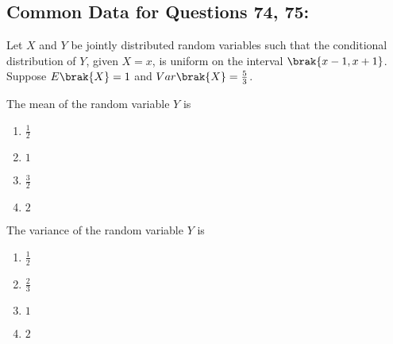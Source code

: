 \subsection*{Common Data for Questions 74, 75:}
Let $X$ and $Y$ be jointly distributed random variables such that the conditional distribution of $Y$, given $X = x$, is uniform on the interval $\brak{x-1, x+1}$. Suppose $E\brak{X} = 1$ and $Var\brak{X} = \frac{5}{3}$.
\item The mean of the random variable $Y$ is 
\begin{multicols}{2}
    \begin{enumerate}
        \item $\frac{1}{2}$
        \item $1$
        \item $\frac{3}{2}$
        \item $2$
    \end{enumerate}
\end{multicols}
\item The variance of the random variable $Y$ is
\begin{multicols}{2}
    \begin{enumerate}
        \item $\frac{1}{2}$
        \item $\frac{2}{3}$
        \item $1$
        \item $2$
    \end{enumerate}
\end{multicols}

